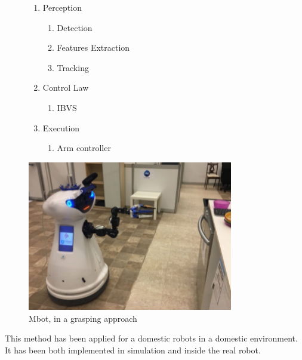 \begin{figure} [!h]
    \begin{minipage}[b]{0.5\linewidth}
        \begin{enumerate}
            \item Perception
            \begin{enumerate}
                \item Detection
                \item Features Extraction
                \item Tracking 
            \end{enumerate}
                \item Control Law
            \begin{enumerate}
                \item \gls{IBVS}
            \end{enumerate}
            \item Execution
            \begin{enumerate}
                \item Arm controller
            \end{enumerate}
        \end{enumerate}
    \end{minipage}
    \begin{minipage}[b]{0.5\linewidth}
      \begin{center}
        \includegraphics[width=0.8\textwidth]{images/mbot_grasping.png}
      \end{center}
      \caption{Mbot, in a grasping approach}
    \end{minipage}
\end{figure}

\newpage


This method has been applied for a domestic robots in a domestic environment. It has been both implemented in simulation and inside the real robot.

